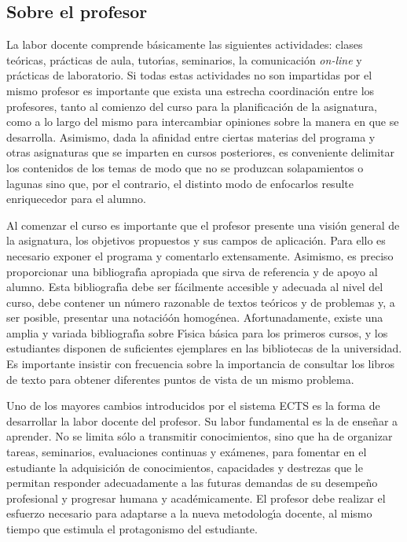 \subsection{Sobre el profesor}
La labor docente comprende b\'{a}sicamente las siguientes actividades: 
 clases te\'{o}ricas,  pr\'{a}cticas de aula, tutor\'{\i}as, seminarios, 
la comunicaci\'{o}n {\it on-line} y pr\'{a}cticas de laboratorio. 
Si todas estas actividades no son impartidas por el mismo profesor es
 importante que exista una estrecha { coordinaci\'{o}n}
 entre los profesores, 
tanto al comienzo del curso para la planificaci\'{o}n de la asignatura, 
como a lo largo del mismo para intercambiar opiniones sobre la manera en que
 se desarrolla. Asimismo, dada la afinidad entre ciertas materias del 
programa y otras asignaturas que se imparten en cursos posteriores,
 es conveniente { delimitar los contenidos} de los temas de modo que no
 se produzcan solapamientos o lagunas sino que, por el contrario,
 el distinto modo de enfocarlos resulte enriquecedor para el alumno.

Al comenzar el curso es importante que el profesor presente una 
visi\'{o}n general de la asignatura, los objetivos propuestos y sus 
campos de aplicaci\'{o}n. Para ello es necesario exponer el programa 
y comentarlo extensamente. Asimismo, es preciso proporcionar una 
bibliograf\'{\i}a apropiada que sirva de referencia y de apoyo al alumno. 
Esta bibliograf\'{\i}a debe ser f\'{a}cilmente accesible y adecuada al 
nivel del curso, debe contener un n\'{u}mero razonable de textos 
 te\'{o}ricos y de problemas y, a ser posible, presentar una notaci\'{o}ón
 homog\'{e}nea. Afortunadamente, existe una amplia y variada bibliograf\'{\i}a
 sobre F\'{\i}sica b\'{a}sica para los primeros
 cursos, y los estudiantes disponen de suficientes 
ejemplares en las bibliotecas de la universidad. 
Es importante insistir con frecuencia sobre
 la importancia de consultar los 
libros de texto para obtener diferentes puntos de vista de un mismo problema. 

Uno de los mayores cambios introducidos por
el sistema ECTS es la forma de desarrollar la labor docente del profesor.
Su labor fundamental  es la de { ense\~{n}ar a aprender}.
No se limita s\'{o}lo a transmitir conocimientos, sino que ha de organizar 
tareas, seminarios, evaluaciones continuas y ex\'{a}menes,
para fomentar en el estudiante la adquisici\'{o}n de conocimientos,
capacidades y destrezas que le permitan responder adecuadamente a las futuras
demandas de su desempe\~{n}o profesional y progresar humana y
acad\'{e}micamente.
El profesor debe realizar el esfuerzo necesario
para adaptarse a la nueva metodolog\'{\i}a docente,
 al mismo tiempo que estimula el protagonismo  del estudiante.

